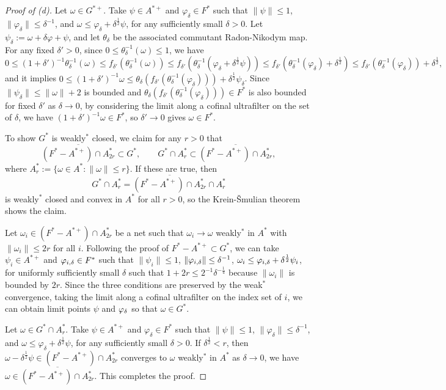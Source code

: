 \documentclass{../../../../small}
\begin{document}
\begin{proof}[Proof of (d)]
Let $\omega\in G^{*+}$.
Take $\psi\in A^{*+}$ and $\varphi_\delta\in F^*$ such that $\|\psi\|\le1$, $\|\varphi_\delta\|\le\delta^{-1}$, and $\omega\le\varphi_\delta+\delta^{\frac12}\psi$, for any sufficiently small $\delta>0$.
Let $\psi_\delta:=\omega+\delta\varphi+\psi$, and let $\theta_\delta$ be the associated commutant Radon-Nikodym map.
For any fixed $\delta'>0$, since $0\le\theta_\delta^{-1}(\omega)\le1$, we have
\[0\le(1+\delta')^{-1}\theta_\delta^{-1}(\omega)\le f_{\delta'}(\theta_\delta^{-1}(\omega))\le f_{\delta'}(\theta_\delta^{-1}(\varphi_\delta+\delta^{\frac12}\psi))
\le f_{\delta'}(\theta_\delta^{-1}(\varphi_\delta)+\delta^{\frac12})\le f_{\delta'}(\theta_\delta^{-1}(\varphi_\delta))+\delta^{\frac12},\]
and it implies $0\le(1+\delta')^{-1}\omega\le\theta_\delta(f_{\delta'}(\theta_\delta^{-1}(\varphi_\delta)))+\delta^{\frac12}\psi_\delta$.
Since $\|\psi_\delta\|\le\|\omega\|+2$ is bounded and $\theta_\delta(f_{\delta'}(\theta_\delta^{-1}(\varphi_\delta)))\in F^*$ is also bounded for fixed $\delta'$ as $\delta\to0$, by considering the limit along a cofinal ultrafilter on the set of $\delta$, we have $(1+\delta')^{-1}\omega\in F^*$, so $\delta'\to0$ gives $\omega\in F^*$.

To show $G^*$ is weakly$^*$ closed, we claim for any $r>0$ that 
\[\overline{(F^*-A^{*+})\cap A_{2r}^*}\subset G^*,\qquad G^*\cap A_r^*\subset\overline{(F^*-A^{*+})\cap A_{2r}^*},\]
where $A_r^*:=\{\omega\in A^*:\|\omega\|\le r\}$.
If these are true, then
\[G^*\cap A_r^*=\overline{(F^*-A^{*+})\cap A_{2r}^*}\cap A_r^*\]
is weakly$^*$ closed and convex in $A^*$ for all $r>0$, so the Krein-\v Smulian theorem shows the claim.

Let $\omega_i\in(F^*-A^{*+})\cap A_{2r}^*$ be a net such that $\omega_i\to\omega$ weakly$^*$ in $A^*$ with $\|\omega_i\|\le2r$ for all $i$.
Following the proof of $F^*-A^{*+}\subset G^*$, we can take $\psi_i\in A^{*+}$ and $\varphi_{i,\delta}\in F^*$ such that $\|\psi_i\|\le1$, $\|\varphi_{i,\delta}\|\le\delta^{-1}$, $\omega_i\le\varphi_{i,\delta}+\delta^{\frac12}\psi_i$, for uniformly sufficiently small $\delta$ such that $1+2r\le2^{-1}\delta^{-\frac14}$ because $\|\omega_i\|$ is bounded by $2r$.
Since the three conditions are preserved by the weak$^*$ convergence, taking the limit along a cofinal ultrafilter on the index set of $i$, we can obtain limit points $\psi$ and $\varphi_\delta$ so that $\omega\in G^*$.

Let $\omega\in G^*\cap A_r^*$.
Take $\psi\in A^{*+}$ and $\varphi_\delta\in F^*$ such that $\|\psi\|\le1$, $\|\varphi_\delta\|\le\delta^{-1}$, and $\omega\le\varphi_\delta+\delta^{\frac12}\psi$, for any sufficiently small $\delta>0$.
If $\delta^{\frac12}<r$, then $\omega-\delta^{\frac12}\psi\in(F^*-A^{*+})\cap A_{2r}^*$ converges to $\omega$ weakly$^*$ in $A^*$ as $\delta\to0$, we have $\omega\in\overline{(F^*-A^{*+})\cap A_{2r}^*}$.
This completes the proof.
\end{proof}
\end{document}
